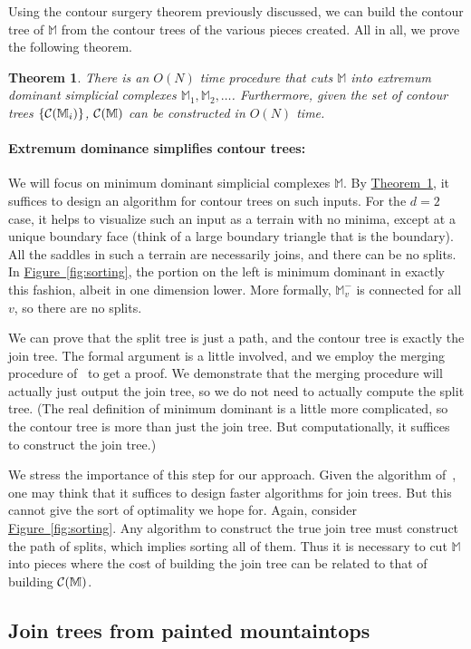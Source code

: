 \documentclass[11pt]{article}
\newcommand{\myparagraph}[1]{\paragraph{#1}}
\newtheorem{theorem}{Theorem}[section]
\theoremstyle{definition}
\newcommand{\cC}{{\cal C}}
\newcommand{\MM}{\mathbb{M}}
\newcommand{\Fig}[1]{\hyperref[fig:#1]{Figure~\ref*{fig:#1}}} %
\newcommand{\Thm}[1]{\hyperref[thm:#1]{Theorem~\ref*{thm:#1}}} %
\begin{document}
{Using the contour surgery theorem previously discussed, we can build the contour tree of $\MM$
from the contour trees of the various pieces created. All in all, we prove the following theorem.

\begin{theorem} \label{thm:int-rain} There is an $O(N)$ time procedure that cuts $\MM$ into extremum dominant simplicial complexes
$\MM_1, \MM_2, \ldots$. Furthermore, given the set of contour trees $\{\cC(\MM_i)\}$, $\cC(\MM)$ can be constructed in $O(N)$ time.
\end{theorem}

\myparagraph{Extremum dominance simplifies contour trees:} We will focus on minimum dominant simplicial complexes $\MM$. By \Thm{int-rain}, it suffices
to design an algorithm for contour trees on such inputs. 
For the $d=2$ case, it helps to visualize such an input as a terrain with no minima,
except at a unique boundary face (think of a large boundary triangle that is the boundary).
All the saddles in such a terrain are necessarily joins, and there can be no splits.
In \Fig{sorting}, the portion on the left is minimum dominant in exactly this fashion, albeit in one dimension lower.
More formally, $\MM^-_v$ is connected for all $v$, so there are no splits.

We can prove that the split tree is just a path, and the contour tree is exactly
the join tree. The formal argument is a little involved, and we employ the merging procedure
of~\cite{csa-cctad-03} to get a proof. We demonstrate that the merging procedure will
actually just output the join tree, so we do not need to actually compute the split tree.
(The real definition of minimum dominant is a little more complicated,
so the contour tree is more than just the join tree. But computationally, it suffices
to construct the join tree.)

We stress the importance of this step for our approach. Given the algorithm of~\cite{csa-cctad-03},
one may think that it suffices to design faster algorithms for join trees. But this
cannot give the sort of optimality we hope for. Again, consider \Fig{sorting}. Any algorithm
to construct the true join tree must construct the path of splits, which implies
sorting all of them. Thus it is necessary to cut $\MM$ into pieces where the cost
of building the join tree can be related to that of building $\cC(\MM)$.

\subsection{Join trees from painted mountaintops} \label{sec:join-paint}

}
\end{document}
